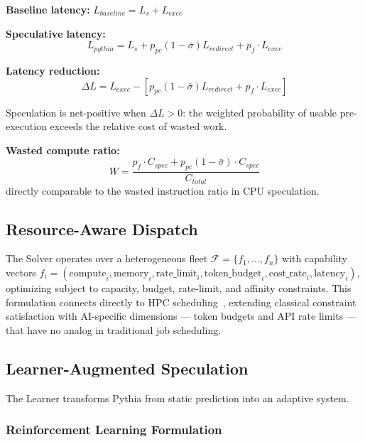 \documentclass[conference,10pt]{IEEEtran}
\begin{document}
\textbf{Baseline latency:} $L_{baseline} = L_s + L_{exec}$

\textbf{Speculative latency:}
\begin{equation}
L_{pythia} = L_s + p_{pc}(1 - \bar{\sigma})L_{redirect} + p_f \cdot L_{exec}
\end{equation}

\textbf{Latency reduction:}
\begin{equation}
\Delta L = L_{exec} - \left[p_{pc}(1 - \bar{\sigma})L_{redirect} + p_f \cdot L_{exec}\right]
\end{equation}

Speculation is net-positive when $\Delta L > 0$: the weighted probability of usable pre-execution exceeds the relative cost of wasted work.

\textbf{Wasted compute ratio:}
\begin{equation}
W = \frac{p_f \cdot C_{spec} + p_{pc}(1 - \bar{\sigma}) \cdot C_{spec}}{C_{total}}
\end{equation}
directly comparable to the wasted instruction ratio in CPU speculation.

\subsection{Resource-Aware Dispatch}

The Solver operates over a heterogeneous fleet $\mathcal{F} = \{f_1, \ldots, f_n\}$ with capability vectors $f_i = (\text{compute}_i, \text{memory}_i, \text{rate\_limit}_i, \text{token\_budget}_i, \text{cost\_rate}_i, \text{latency}_i)$, optimizing subject to capacity, budget, rate-limit, and affinity constraints.
This formulation connects directly to HPC scheduling~\cite{feitelson1995parallel, yoo2003slurm}, extending classical constraint satisfaction with AI-specific dimensions --- token budgets and API rate limits --- that have no analog in traditional job scheduling.



\subsection{Learner-Augmented Speculation}
\label{sec:learner}

The Learner transforms Pythia from static prediction into an adaptive system.

\subsubsection{Reinforcement Learning Formulation}
\end{document}
